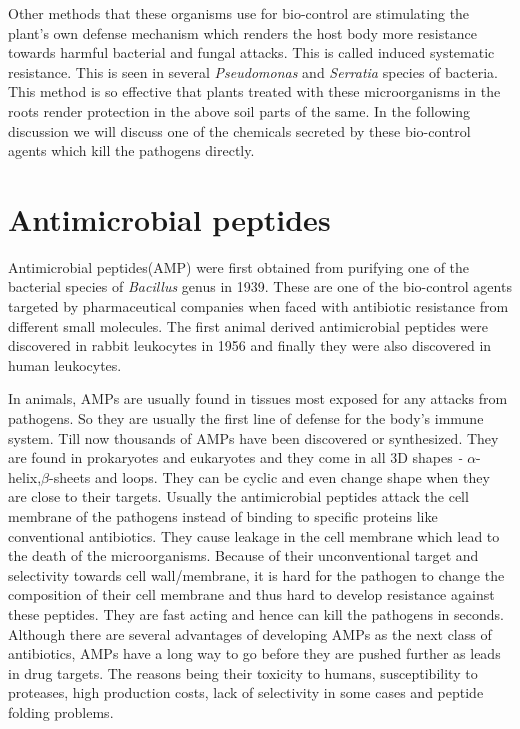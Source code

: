 Other methods that these organisms use for bio-control are stimulating the plant's own defense mechanism which renders the host body more resistance towards harmful bacterial and fungal attacks. This is called induced systematic resistance.
This is seen in several \textit{Pseudomonas} and \textit{Serratia} species of bacteria.\cite{Aziz2009,Monica2009,Mantil2018}
This method is so effective that plants treated with these microorganisms in the roots render protection in the above soil parts of the same.\cite{Thonart2007}
In the following discussion we will discuss one of the chemicals secreted by these bio-control agents which kill the pathogens directly.

\section{Antimicrobial peptides}
Antimicrobial peptides(AMP) were first obtained from purifying one of the bacterial species of \textit{Bacillus} genus in 1939.\cite{Dubos1939,Ren2013}
These are one of the bio-control agents targeted by pharmaceutical companies 
when faced with antibiotic resistance from different small molecules.
The first animal derived antimicrobial peptides were discovered in rabbit leukocytes in 1956 and finally they were also discovered in human leukocytes.\cite{Hirsch1956,Spitznagel1963,Ren2013}

In animals, AMPs are usually found in tissues most exposed for any attacks from pathogens. So they are usually the first line of defense for the body's immune system. Till now thousands of AMPs have been discovered or synthesized. They are found in prokaryotes and eukaryotes
and they come in all 3D shapes \textit{\--} $\alpha$-helix,$\beta$-sheets and loops. They can be cyclic and even change shape when they are close to their targets.\cite{LEIPPE1999,Jabra2010,Huang2010,Sonnevend1970}
Usually the antimicrobial peptides attack the cell membrane of the pathogens instead of binding to specific proteins like conventional antibiotics.\cite{Hancock2006} They cause leakage in the cell membrane which lead to the death of the microorganisms.
Because of their unconventional target and selectivity towards cell wall/membrane, it is hard for the pathogen to change the composition of their cell membrane and thus hard to develop resistance against these peptides.\cite{Hancock2006,Ren2013} They are fast acting and hence can kill the pathogens in seconds.\cite{Fischetti2001} 
Although there are several advantages of developing AMPs as the next class of antibiotics, AMPs have a long way to go before they are pushed further as leads in drug targets. The reasons being their toxicity to humans, susceptibility to proteases, high production costs, lack of selectivity in some cases and peptide folding problems.\cite{Tossi2002}

